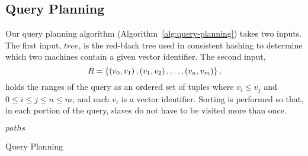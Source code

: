 \subsection{Query Planning}
Our query planning algorithm (Algorithm~\ref{alg:query-planning}) takes two
inputs. The first input, \(tree\), is the red-black tree used in consistent
hashing to determine which two machines contain a given vector identifier. The
second input,
\[R = \left\{\left(v_0, v_1\right), \left(v_1, v_2\right), \ldots, \left(v_n, v_m\right)\right\},\]
holds the ranges of the query as an ordered set of tuples where
\(v_i \leq v_j\) and \(0 \leq i \leq j \leq n \leq m\), and each \(v_i\) is a
vector identifier. Sorting is performed so that, in each portion of the query,
slaves do not have to be visited more than once.
%
\begin{algorithm}
    \begin{algorithmic}
                    \Else
                    \EndIf
                \EndFor
            \EndFor
            \Return $paths$
        \EndProcedure
    \end{algorithmic}
    \caption{Query Planning}
    \label{alg:query-planning}
\end{algorithm}
%
